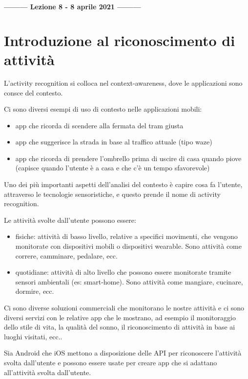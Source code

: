 \begin{center}
    \textbf{--------- Lezione 8 - 8 aprile 2021 ---------}
\end{center}

\section{Introduzione al riconoscimento di attività}
L'activity recognition si colloca nel context-awareness, dove le applicazioni sono consce del contesto. 

Ci sono diversi esempi di uso di contesto nelle applicazioni mobili:
\begin{itemize}
    \item app che ricorda di scendere alla fermata del tram giusta
    \item app che suggerisce la strada in base al traffico attuale (tipo waze)
    \item app che ricorda di prendere l'ombrello prima di uscire di casa quando piove (capisce quando l'utente è a casa e che c'è un tempo sfavorevole)
\end{itemize} 

Uno dei più importanti aspetti dell'analisi del contesto è capire cosa fa l'utente, attraverso le tecnologie sensoristiche, e questo prende il nome di activity recognition. 

Le attività svolte dall'utente possono essere:
\begin{itemize}
    \item fisiche: attività di basso livello, relative a specifici movimenti, che vengono monitorate con dispositivi mobili o dispositivi wearable. Sono attività come correre, camminare, pedalare, ecc. 
    \item quotidiane: attività di alto livello che possono essere monitorate tramite sensori ambientali (es: smart-home). Sono attività come mangiare, cucinare, dormire, ecc.
\end{itemize}

Ci sono diverse soluzioni commerciali che monitorano le nostre attività e ci sono diversi servizi con le relative app che le mostrano, ad esempio il monitoraggio dello stile di vita, la qualità del sonno, il riconoscimento di attività in base ai luoghi visitati, ecc..

Sia Android che iOS mettono a disposizione delle API per riconoscere l'attività svolta dall'utente e possono essere usate per creare app che si adattano all'attività svolta dall'utente.

